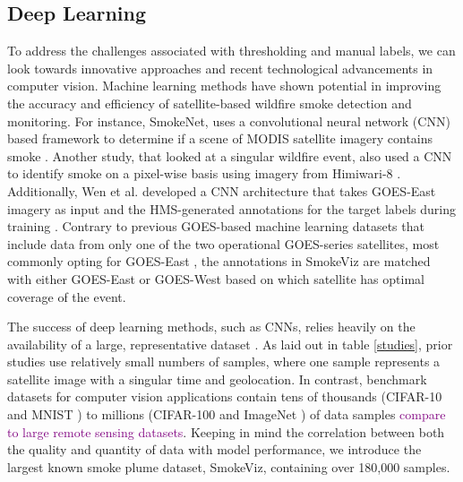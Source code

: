 \documentclass{article}
\newcommand\reynotes[1]{\textcolor{purple}{#1}}
\begin{document}
\subsection{Deep Learning}

To address the challenges associated with thresholding and manual labels, we can look towards innovative approaches and recent technological advancements in computer vision. Machine learning methods have shown potential in improving the accuracy and efficiency of satellite-based wildfire smoke detection and monitoring. For instance, SmokeNet, uses a convolutional neural network (CNN) based framework to determine if a scene of MODIS satellite imagery contains smoke \cite{smokenet}. Another study, that looked at a singular wildfire event, also used a CNN to identify smoke on a pixel-wise basis using imagery from Himiwari-8 \cite{larsen}. Additionally, Wen et al. developed a CNN architecture that takes GOES-East imagery as input and the HMS-generated annotations for the target labels during training \cite{smoke_goes}. Contrary to previous GOES-based machine learning datasets that include data from only one of the two operational GOES-series satellites, most commonly opting for GOES-East \cite{smoke_goes, wildfire_detect, goes_conv, contrail}, the annotations in SmokeViz are matched with either GOES-East or GOES-West based on which satellite has optimal coverage of the event. 

The success of deep learning methods, such as CNNs, relies heavily on the availability of a large, representative dataset \cite{data_size}. As laid out in table \ref{studies}, prior studies use relatively small numbers of samples, where one sample represents a satellite image with a singular time and geolocation. In contrast, benchmark datasets for computer vision applications contain tens of thousands (CIFAR-10 \cite{cifar} and MNIST \cite{mnist}) to millions (CIFAR-100 and ImageNet \cite{imgnet}) of data samples \reynotes{compare to large remote sensing datasets}. Keeping in mind the correlation between both the quality and quantity of data with model performance, we introduce the largest known smoke plume dataset, SmokeViz, containing over 180,000 samples.
\end{document}
